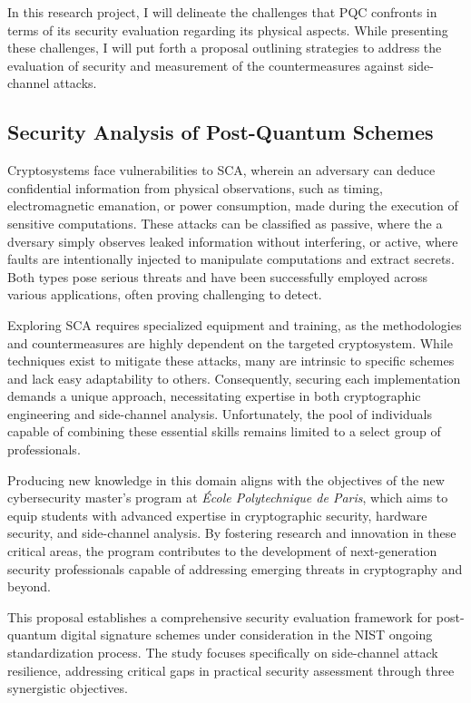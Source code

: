 \documentclass[11pt, a4paper]{article}
\begin{document}
In this research project, I will delineate the challenges that PQC confronts 
in terms of its security evaluation regarding its physical aspects. While presenting these challenges, 
I will put forth a proposal outlining strategies to address the evaluation of security and measurement of 
the countermeasures against side-channel attacks. 

\subsection*{Security Analysis of Post-Quantum Schemes}\label{sec:an}\vspace{-0.1cm}

Cryptosystems face vulnerabilities to SCA, wherein an adversary can deduce 
confidential information from physical observations, such as timing,
electromagnetic emanation, or power consumption, made during the execution of 
sensitive computations. These attacks can be classified as passive, where the a
dversary simply observes leaked information without interfering, or active, 
where faults are intentionally injected to manipulate computations and extract 
secrets. Both types pose serious threats and have been successfully employed 
across various applications, often proving challenging to detect.

Exploring SCA requires specialized equipment and training, as the 
methodologies and countermeasures are highly dependent on the targeted 
cryptosystem. While techniques exist to mitigate these attacks, many are 
intrinsic to specific schemes and lack easy adaptability to others. Consequently, 
securing each implementation demands a unique approach, necessitating 
expertise in both cryptographic engineering and side-channel analysis. 
Unfortunately, the pool of individuals capable of combining these
essential skills remains limited to a select group of professionals.



Producing new knowledge in this domain aligns with the objectives of the new cybersecurity 
master's program at \emph{École Polytechnique de Paris}, which aims to equip students with advanced 
expertise in cryptographic security, hardware security, and side-channel analysis. By fostering 
research and innovation in these critical areas, the program contributes to the development of 
next-generation security professionals capable of addressing emerging threats in cryptography 
and beyond.

This proposal establishes a comprehensive security evaluation framework for 
post-quantum digital signature schemes under consideration in the
NIST ongoing standardization process. 
The study focuses specifically on side-channel attack resilience, 
addressing critical gaps in practical security assessment through three 
synergistic objectives.
\end{document}
